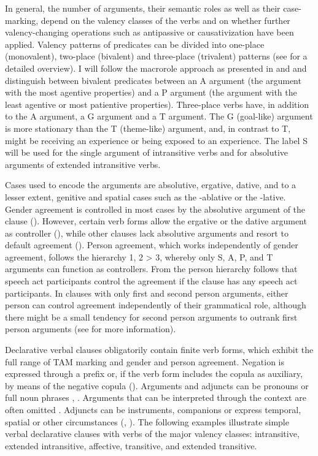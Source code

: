 In general, the number of arguments, their semantic roles as well as their case-marking, depend on the valency classes of the verbs and on whether further valency-changing operations such as antipassive or causativization have been applied. Valency patterns of predicates can be divided into one-place (monovalent), two-place (bivalent) and three-place (trivalent) patterns (see  for a detailed overview). I will follow the macrorole approach as presented in \citet{Bickel2011} and \citet{Bickel.etal2015} and distinguish between bivalent predicates between an A argument (the argument with the most agentive properties) and a P argument (the argument with the least agentive or most patientive properties). Three-place verbs have, in addition to the A argument, a G argument and a T argument. The G (goal-like) argument is more stationary than the T (theme-like) argument, and, in contrast to T, might be receiving an experience or being exposed to an experience. The label S will be used for the single argument of intransitive verbs and for absolutive arguments of extended intransitive verbs.

Cases used to encode the arguments are absolutive, ergative, dative, and to a lesser extent, genitive and spatial cases such as the -ablative or the -lative. Gender agreement is controlled in most cases by the absolutive argument of the clause (). However, certain verb forms allow the ergative or the dative argument as controller (), while other clauses lack absolutive arguments and resort to default agreement (). Person agreement, which works  independently of gender agreement, follows the hierarchy 1, 2 > 3, whereby only S, A, P, and T arguments can function as controllers. From the person hierarchy follows that speech act participants control the agreement if the clause has any speech act participants. In clauses with only first and second person arguments, either person can control agreement independently of their grammatical role, although there might be a small tendency for second person arguments to outrank first person arguments (see  for more information).

Declarative verbal clauses obligatorily contain finite verb forms, which exhibit the full range of TAM marking and gender and person agreement. Negation is expressed through a prefix or, if the verb form includes the copula as auxiliary, by means of the negative copula (). Arguments and adjuncts can be pronouns or full noun phrases , . Arguments that can be interpreted through the context are often omitted . Adjuncts can be instruments, companions or express temporal, spatial or other circumstances (, ). The following examples illustrate simple verbal declarative clauses with verbs of the major valency classes: intransitive, extended intransitive, affective, transitive, and extended transitive. 


